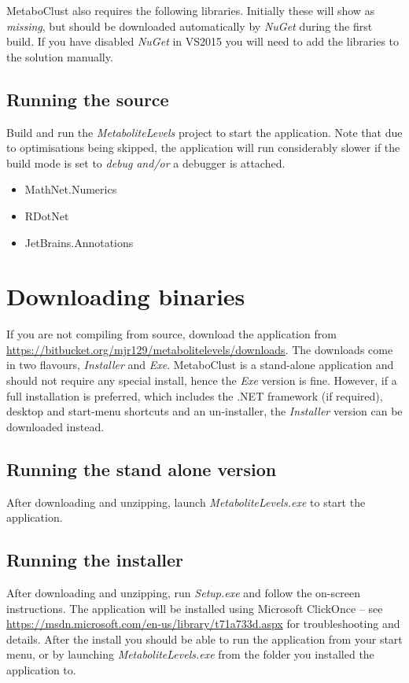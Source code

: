 \documentclass[11pt,a4paper]{article}
\newcommand{\menu}[1]{ \flqq\textit{#1}\frqq}
\begin{document}
MetaboClust also requires the following libraries. Initially these will show as \textit{missing}, but should be downloaded automatically by \textit{NuGet} during the first build. If you have disabled \textit{NuGet} in VS2015 you will need to add the libraries to the solution manually.

\subsection{Running the source}
Build and run the \textit{MetaboliteLevels} project to start the application. Note that due to optimisations being skipped, the application will run considerably slower if the build mode is set to \menu{debug} \textit{and/or} a debugger is attached.

\begin{itemize}
	\item MathNet.Numerics
	\item RDotNet
	\item JetBrains.Annotations
\end{itemize}

\section{Downloading binaries}

If you are not compiling from source, download the application from \url{https://bitbucket.org/mjr129/metabolitelevels/downloads}. The downloads come in two flavours, \textit{Installer} and \textit{Exe}. MetaboClust is a stand-alone application and should not require any special install, hence the \textit{Exe} version is fine. However, if a full installation is preferred, which includes the .NET framework (if required), desktop and start-menu shortcuts and an un-installer, the \textit{Installer} version can be downloaded instead.

\subsection{Running the stand alone version}
After downloading and unzipping, launch \textit{MetaboliteLevels.exe} to start the application.

\subsection{Running the installer}
After downloading and unzipping, run \textit{Setup.exe} and follow the on-screen instructions. The application will be installed using Microsoft ClickOnce -- see \url{https://msdn.microsoft.com/en-us/library/t71a733d.aspx} for troubleshooting and details. After the install you should be able to run the application from your start menu, or by launching \textit{MetaboliteLevels.exe} from the folder you installed the application to.
\end{document}

